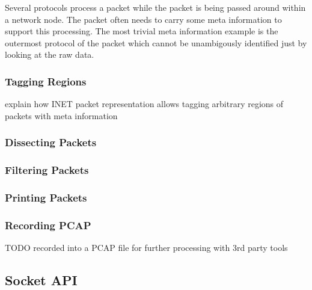 Several protocols process a packet while the packet is being passed around
within a network node. The packet often needs to carry some meta
information to support this processing. The most trivial meta information
example is the outermost protocol of the packet which cannot be
unambigously identified just by looking at the raw data.



\subsubsection*{Tagging Regions}

explain how INET packet representation allows tagging arbitrary regions of
packets with meta information


\subsubsection*{Dissecting Packets}



\subsubsection*{Filtering Packets}


\subsubsection*{Printing Packets}


\subsubsection*{Recording PCAP}

TODO recorded into a PCAP file for further processing with 3rd party tools

\subsection{Socket API}
\label{subsec:socket-api}

